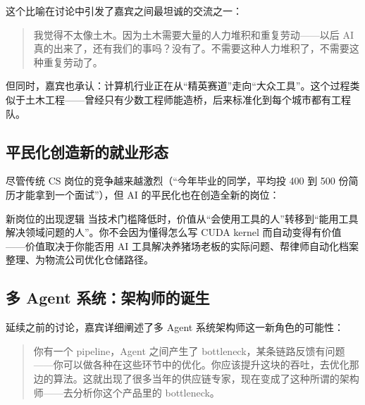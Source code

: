 这个比喻在讨论中引发了嘉宾之间最坦诚的交流之一：

\begin{quote}
我觉得不太像土木。因为土木需要大量的人力堆积和重复劳动——以后 AI 真的出来了，还有我们的事吗？没有了。不需要这种人力堆积了，不需要这种重复劳动了。
\end{quote}

但同时，嘉宾也承认：计算机行业正在从``精英赛道''走向``大众工具''。这个过程类似于土木工程——曾经只有少数工程师能造桥，后来标准化到每个城市都有工程队。

\subsection{平民化创造新的就业形态}

尽管传统 CS 岗位的竞争越来越激烈（``今年毕业的同学，平均投 400 到 500 份简历才能拿到一个面试''），但 AI 的平民化也在创造全新的岗位：

\begin{importantbox}{新岗位的出现逻辑}
当技术门槛降低时，价值从``会使用工具的人''转移到``能用工具解决领域问题的人''。你不会因为懂得怎么写 CUDA kernel 而自动变得有价值——价值取决于你能否用 AI 工具解决养猪场老板的实际问题、帮律师自动化档案整理、为物流公司优化仓储路径。
\end{importantbox}

\subsection{多 Agent 系统：架构师的诞生}

延续之前的讨论，嘉宾详细阐述了多 Agent 系统架构师这一新角色的可能性：

\begin{quote}
你有一个 pipeline，Agent 之间产生了 bottleneck，某条链路反馈有问题——你可以做各种在这些环节中的优化。你应该提升这块的吞吐，去优化那边的算法。这就出现了很多当年的供应链专家，现在变成了这种所谓的架构师——去分析你这个产品里的 bottleneck。
\end{quote}

